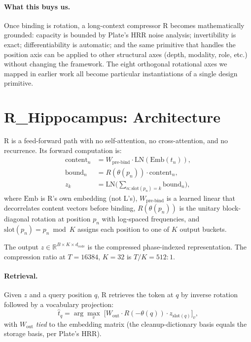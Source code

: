 \documentclass[10pt, twocolumn, a4paper]{article}
\newcommand{\R}{\mathbb{R}}
\begin{document}
\paragraph{What this buys us.} Once binding is rotation, a long-context compressor R becomes mathematically grounded: capacity is bounded by Plate's HRR noise analysis; invertibility is exact; differentiability is automatic; and the same primitive that handles the position axis can be applied to other structural axes (depth, modality, role, etc.) without changing the framework. The eight orthogonal rotational axes we mapped in earlier work \cite{rotation-design-space} all become particular instantiations of a single design primitive.


\section{R\_Hippocampus: Architecture}
\label{sec:r_hippo}

R is a feed-forward path with no self-attention, no cross-attention, and no recurrence. Its forward computation is:
\begin{align}
\text{content}_n &= W_{\text{pre-bind}} \cdot \text{LN}(\text{Emb}(t_n)), \\
\text{bound}_n &= R(\theta(p_n)) \cdot \text{content}_n, \\
z_k &= \text{LN}\Big( \sum_{n: \text{slot}(p_n) = k} \text{bound}_n \Big),
\end{align}
where $\text{Emb}$ is R's own embedding (not L's), $W_{\text{pre-bind}}$ is a learned linear that decorrelates content vectors before binding, $R(\theta(p_n))$ is the unitary block-diagonal rotation at position $p_n$ with log-spaced frequencies, and $\text{slot}(p_n) = p_n \bmod K$ assigns each position to one of $K$ output buckets.

The output $z \in \R^{B \times K \times d_{\text{code}}}$ is the compressed phase-indexed representation. The compression ratio at $T=16384$, $K=32$ is $T/K = 512:1$.

\paragraph{Retrieval.} Given $z$ and a query position $q$, R retrieves the token at $q$ by inverse rotation followed by a vocabulary projection:
\begin{equation}
\hat{t}_q = \arg\max_v\; \big[ W_{\text{out}} \cdot R(-\theta(q)) \cdot z_{\text{slot}(q)} \big]_v,
\end{equation}
with $W_{\text{out}}$ \emph{tied} to the embedding matrix (the cleanup-dictionary basis equals the storage basis, per Plate's HRR).
\end{document}
